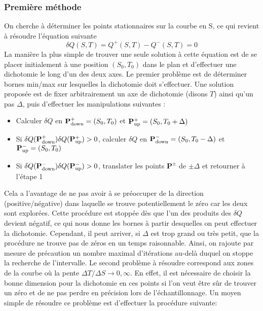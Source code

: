 \documentclass[a4paper,11pt]{article}
\begin{document}
    \subsubsection{Première méthode}
        On cherche à déterminer les points stationnaires sur la courbe en S, ce qui revient à résoudre l'équation suivante
        \begin{equation}
            \delta Q (S, T) = Q^+ (S,T) - Q^- (S,T) = 0
        \end{equation}
        La manière la plus simple de trouver une seule solution à cette équation est de se placer initialement à une position $(S_0 , T_0)$ dans le plan et d'effectuer une dichotomie le long d'un des deux axes. Le premier problème est de déterminer bornes min/max sur lesquelles la dichotomie doit s'effectuer. \newline
        Une solution proposée est de fixer arbitrairement un axe de dichotomie (disons $T$) ainsi qu'un pas $\Delta$, puis d'effectuer les manipulations suivantes :
        \begin{itemize}
            \item Calculer $\delta Q$ en $\mathbf{P^+_{\rm{down}}} = (S_0 , T_0)$ et $\mathbf{P^+_{\rm{up}}} = (S_0 , T_0 + \Delta)$
        
            \item Si $\delta Q (\mathbf{P^+_{\rm{down}}}) \delta Q (\mathbf{P^+_{\rm{up}}}) > 0$, calculer $\delta Q$ en $\mathbf{P^-_{\rm{down}}} = (S_0 , T_0 - \Delta)$ et $\mathbf{P^-_{\rm{up}}} = (S_0 , T_0)$
        
            \item Si $\delta Q (\mathbf{P^-_{\rm{down}}}) \delta Q (\mathbf{P^-_{\rm{up}}}) > 0$, translater les points $\mathbf{P^{\pm}}$ de $\pm \Delta$ et retourner à l'étape 1
        \end{itemize}
    
        Cela a l'avantage de ne pas avoir à se préoccuper de la direction (positive/négative) dans laquelle se trouve potentiellement le zéro car les deux sont explorées.\newline
        Cette procédure est stoppée dès que l'un des produits des $\delta Q$ devient négatif, ce qui nous donne les bornes à partir desquelles on peut effectuer la dichotomie. Cependant, il peut arriver, si $\Delta$ est trop grand ou très petit, que la procédure ne trouve pas de zéros en un temps raisonnable. Ainsi, on rajoute par mesure de précaution un nombre maximal d'itérations au-delà duquel on stoppe la recherche de l'intervalle.\newline
        Le second problème à résoudre correspond aux zones de la courbe où la pente $\Delta T / \Delta S \xrightarrow{} 0 , \infty$. En effet, il est nécessaire de choisir la bonne dimension pour la dichotomie en ces points si l'on veut être sûr de trouver un zéro et de ne pas perdre en précision lors de l'échantillonnage. Un moyen simple de résoudre ce problème est d'effectuer la procédure suivante:
    
\end{document}
